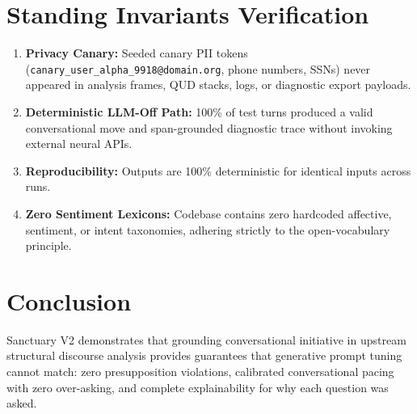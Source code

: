 \documentclass[11pt,a4paper]{article}
\begin{document}
\section{Standing Invariants Verification}

\begin{enumerate}
    \item \textbf{Privacy Canary:} Seeded canary PII tokens (\texttt{canary\_user\_alpha\_9918@domain.org}, phone numbers, SSNs) never appeared in analysis frames, QUD stacks, logs, or diagnostic export payloads.
    \item \textbf{Deterministic LLM-Off Path:} 100\% of test turns produced a valid conversational move and span-grounded diagnostic trace without invoking external neural APIs.
    \item \textbf{Reproducibility:} Outputs are 100\% deterministic for identical inputs across runs.
    \item \textbf{Zero Sentiment Lexicons:} Codebase contains zero hardcoded affective, sentiment, or intent taxonomies, adhering strictly to the open-vocabulary principle.
\end{enumerate}

\section{Conclusion}

Sanctuary V2 demonstrates that grounding conversational initiative in upstream structural discourse analysis provides guarantees that generative prompt tuning cannot match: zero presupposition violations, calibrated conversational pacing with zero over-asking, and complete explainability for why each question was asked.
\end{document}
